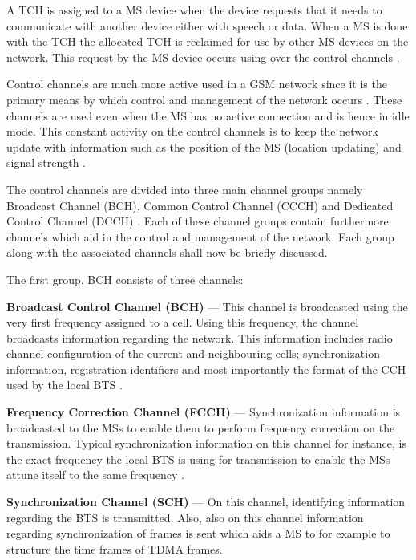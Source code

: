 A TCH is assigned to a MS device when the device requests that it needs to communicate with another device either with speech or data. When a MS is done with the TCH the allocated TCH is reclaimed for use by other MS devices on the network. This request by the MS device occurs using over the control channels \cite{GSMArchitectureProtocolsServices}.

Control channels are much more active used in a GSM network since it is the primary means by which control and management of the network occurs \cite{GSMArchitectureProtocolsServices}. These channels are used even when the MS has no active connection and is hence in idle mode. This constant activity on the control channels is to keep the network update with information such as the position of the MS (location updating) and signal strength \cite{GSMArchitectureProtocolsServices,GSMSysEngin,Eisenblatter}. 

The control channels are divided into three main channel groups namely Broadcast Channel (BCH), Common Control Channel (CCCH) and Dedicated Control Channel (DCCH) \cite{GSMArchitectureProtocolsServices}. Each of these channel groups contain furthermore channels which aid in the control and management of the network. Each group along with the associated channels shall now be briefly discussed.

The first group, BCH consists of three channels:
\begin{description}
\item{\textbf{Broadcast Control Channel (BCH)}} --- This channel is broadcasted using the very first frequency assigned to a cell. Using this frequency, the channel broadcasts information regarding the network. This information includes radio channel configuration of the current and neighbouring cells; synchronization information, registration identifiers and most importantly the format of the CCH used by the local BTS \cite{GSMArchitectureProtocolsServices}.
\item{\textbf{Frequency Correction Channel (FCCH)}} --- Synchronization information is broadcasted to the MSs to enable them to perform frequency correction on the transmission. Typical synchronization information on this channel for instance, is the exact frequency the local BTS is using for transmission to enable the MSs attune itself to the same frequency \cite{GSMArchitectureProtocolsServices}.
\item{\textbf{Synchronization Channel (SCH)}} --- On this channel, identifying information regarding the BTS is transmitted. Also, also on this channel information regarding synchronization of frames is sent which aids a MS to for example to structure the time frames of TDMA frames.
\end{description}


